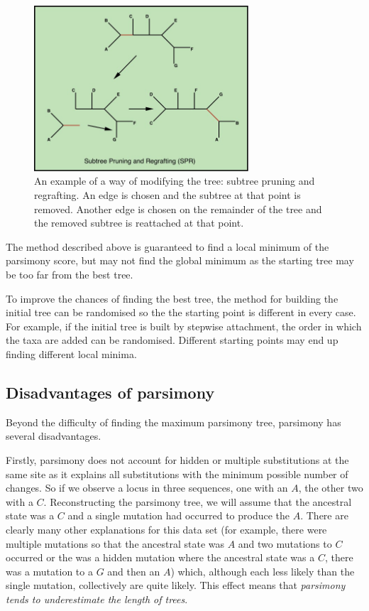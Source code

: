 \documentclass[11pt]{article}
\begin{document}
\begin{figure}[hbtp]
\includegraphics[width=8cm]{figures/spr}
\caption{An example of a way of modifying the tree: subtree pruning and regrafting.  An edge is chosen and the subtree at that point is removed.  Another edge is chosen on the remainder of the tree and the removed subtree is reattached at that point.}
\label{fig:spr}
\end{figure}


The method described above is guaranteed to find a local minimum of the parsimony score, but may not find the global minimum as the starting tree may be too far from the best tree.  

To improve the chances of finding the best tree, the method for building the initial tree can be randomised so the the starting point is different in every case.   For example, if the initial tree is built by stepwise attachment, the order in which the taxa are added can be randomised.  Different starting points may end up finding different local minima.  



\subsection{Disadvantages of parsimony}

Beyond the difficulty of finding  the maximum parsimony tree, parsimony has several disadvantages.  

Firstly,  parsimony does not account for hidden or multiple substitutions at the same site as it explains all substitutions with the minimum possible number of changes.  So if we observe a locus in three sequences, one with an $A$, the other two with a $C$.  Reconstructing the parsimony tree, we will assume that the ancestral state was a $C$ and a single mutation had occurred to produce the $A$.  There are clearly many other explanations for this data set (for example, there were multiple mutations so that the ancestral state was $A$ and two mutations to $C$ occurred or the was a hidden mutation where the ancestral state was a $C$, there was a mutation to a $G$ and then an $A$) which, although each less likely than the single mutation, collectively are quite likely.  This effect means that {\em parsimony tends to underestimate the length of trees}.
\end{document}
